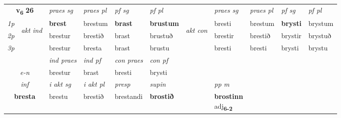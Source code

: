 \noindent
\begin{tabular}{lllllllllll} \toprule
\multicolumn{2}{c}{\textbf{v{\textsubscript{6}}} \Large{\textbf{26}}}  &  \textit{praes sg}  & \textit{praes pl}  &\textit{ pf sg} & \textit{pf pl} &  &  \textit{praes sg}  & \textit{praes pl}  & \textit{pf sg} & \textit{pf pl } \\*
	\cmidrule{3-6} \cmidrule{8-11}
 {\textit{1p}} & \multirow{3}{*}{\begin{turn}{90}\textit{akt ind}\end{turn}} & \textbf{brest} & brestum & \textbf{brast} & \textbf{brustum} & \multirow{3}{*}{\begin{turn}{90}\textit{akt con}\end{turn}} &bresti & brestum & \textbf{brysti} & brystum\\*
 {\textit{2p}} &  &  brestur  & brestið & brast & brustuð & & brestir & brestið & brystir & brystuð \\*
{\textit{3p}} &  & brestur & bresta & brast & brustu & & bresti & bresti& brysti & brystu \\*
\cmidrule{3-6} \cmidrule{8-11}

   & &  \textit{ind praes} & \textit{ind pf} & \textit{con praes} & \textit{con pf} \\*
\multicolumn{2}{c}{ \textit{e-n} } & brestur & brast & bresti & brysti \\*

\cmidrule{3-8}
   \multicolumn{2}{c}{\textit{inf}}  & \textit{i akt sg} & \textit{i akt pl}   & \textit{presp} & \textit{supin}  && \textit{pp m} \\*
  \multicolumn{2}{c}{\textbf{bresta}} & brestu  & brestið   & brestandi &  \textbf{brostið}  && \specialcell{\textbf{brostinn} \\ adj\textbf{\textsubscript{6-2}}} \\*
\end{tabular}

